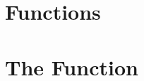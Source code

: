 \documentclass[a4paper,11pt,openany,english]{sphinxmanual}
\begin{document}
\begin{fulllineitems}
\begin{fulllineitems}
\end{fulllineitems}


\end{fulllineitems}



\section{Functions}
\label{\detokenize{api_bootstrap:functions}}

\section{The  Function}
\label{\detokenize{api_bootstrap:the-circmax-function}}
\end{document}
